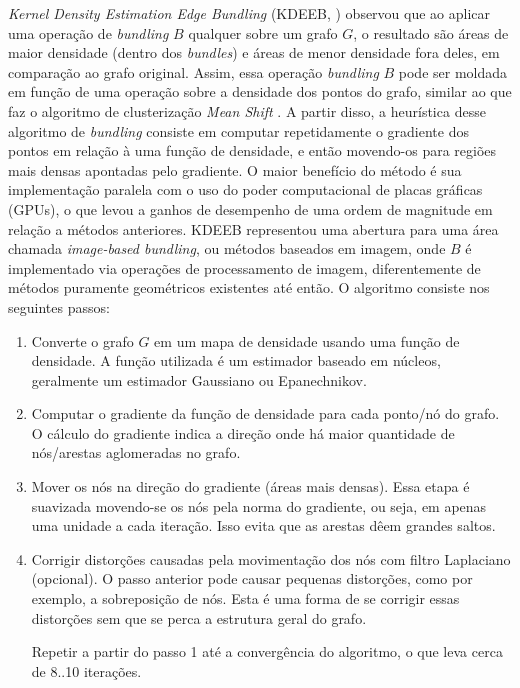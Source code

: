 \emph{Kernel Density Estimation Edge Bundling} (KDEEB, \citet{Hurter2012})
observou que ao aplicar uma operação de \emph{bundling} $B$ qualquer sobre um
grafo $G$, o resultado são áreas de maior densidade (dentro dos \emph{bundles})
e áreas de menor densidade fora deles, em comparação ao grafo original. Assim,
essa operação \emph{bundling} $B$ pode ser moldada em função de uma operação
sobre a densidade dos pontos do grafo, similar ao que faz o algoritmo de
clusterização \emph{Mean Shift} \citep{Comaniciu2012}. A partir disso, a heurística
desse algoritmo de \emph{bundling} consiste em computar repetidamente o
gradiente dos pontos em relação à uma função de densidade, e então movendo-os
para regiões mais densas apontadas pelo gradiente. O maior benefício do método
é sua implementação paralela com o uso do poder computacional de placas
gráficas (GPUs), o que levou a ganhos de desempenho de uma ordem de magnitude
em relação a métodos anteriores. KDEEB representou uma abertura para uma área
chamada \emph{image-based bundling}, ou métodos baseados em imagem, onde $B$ é
implementado via operações de processamento de imagem, diferentemente de
métodos puramente geométricos existentes até então. O algoritmo consiste nos
seguintes passos:

\begin{enumerate}
  \item Converte o grafo $G$ em um mapa de densidade usando uma função de
densidade. A função utilizada é um estimador baseado em núcleos, geralmente um
estimador Gaussiano ou Epanechnikov.

  \item Computar o gradiente da função de densidade para cada ponto/nó do
grafo. O cálculo do gradiente indica a direção onde há maior quantidade
de nós/arestas aglomeradas no grafo.

  \item Mover os nós na direção do gradiente (áreas mais densas). Essa etapa é
suavizada movendo-se os nós pela norma do gradiente, ou seja, em apenas uma unidade
a cada iteração. Isso evita que as arestas dêem grandes saltos.

  \item Corrigir distorções causadas pela movimentação dos nós com filtro
Laplaciano (opcional).  O passo anterior pode causar pequenas distorções, como
por exemplo, a sobreposição de nós. Esta é uma forma de se corrigir essas
distorções sem que se perca a estrutura geral do grafo.

  Repetir a partir do passo 1 até a convergência do algoritmo, o que leva cerca de 8..10
iterações.
\end{enumerate}

